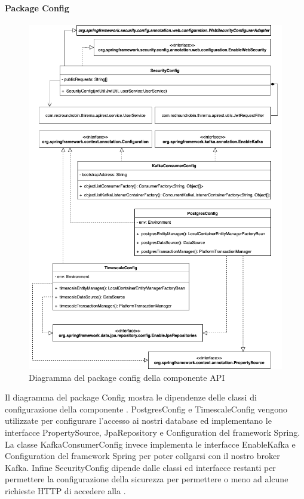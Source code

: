 		\paragraph*{Package Config} 
		\begin{figure}[H]
			\centering
			\includegraphics[scale=0.550]{res/images/API/ConfigPackage.png}
			\caption{Diagramma del package config della componente API}
			\label{Diagramma 12}
		\end{figure}
		Il diagramma del package Config mostra le dipendenze delle classi di configurazione della componente .
		\newline
		PostgresConfig e TimescaleConfig vengono utilizzate per configurare l'accesso ai nostri database ed implementano le interfacce PropertySource, JpaRepository e Configuration del framework Spring.
		\newline
		La classe KafkaConsumerConfig invece implementa le interfacce EnableKafka e Configuration del framework Spring per poter collgarsi con il nostro broker Kafka.
		\newline
		Infine SecurityConfig dipende dalle classi ed interfacce restanti per permettere la configurazione della sicurezza per permettere o meno ad alcune richieste HTTP di accedere alla .
		\newpage
